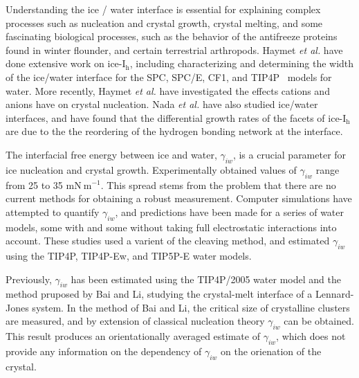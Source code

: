 %
%

Understanding the ice / water interface is essential for explaining
complex processes such as nucleation and crystal
growth,\cite{Han1992,Granasy1995,Vanfleet1995} crystal
melting,\cite{Weber1983,Han1992,Sakai1996,Sakai1996B} and some
fascinating biological processes, such as the behavior of the
antifreeze proteins found in winter flounder,\cite{Chapsky1997
  ,Wierzbicki2007} and certain terrestrial
arthropods.\cite{Duman:2001qy,Meister29012013} Haymet \textit{et al.}
have done extensive work on ice-I$_\mathrm{h}$, including
characterizing and determining the width of the ice/water interface
for the SPC,\cite{Karim1990} SPC/E,\cite{Gay2002,Bryk2002}
CF1,\cite{Hayward2001,Hayward2002} and TIP4P~\cite{Karim1988} models
for water.  More recently, Haymet \emph{et al.} have investigated the
effects cations and anions have on crystal
nucleation.\cite{Bryk2004,Smith2005,Wilson2008,Wilson2010} Nada
\textit{et al.}  have also studied ice/water
interfaces,\cite{Nada1995,Nada2000,Nada2003,Nada2012} and have found
that the differential growth rates of the facets of ice-I$_\mathrm{h}$
are due to the the reordering of the hydrogen bonding network at the
interface.\cite{Nada2005}



The interfacial free energy between ice and
water, $\gamma_{iw}$, is a crucial parameter for ice nucleation and
crystal growth.\cite{1,2} Experimentally obtained values of
$\gamma_{iw}$ range from 25 to 35
$\mathrm{mN}~\mathrm{m}^{-1}$.\cite{1} This spread stems from the
problem that there are no current methods for obtaining a robust
measurement. Computer simulations have attempted to quantify
$\gamma_{iw}$, and predictions have been made for a series of water
models, some with\cite{4} and some without\cite{5} taking full
electrostatic interactions into account. These studies used a varient
of the cleaving method,\cite{6} and estimated $\gamma_{iw}$ using the
TIP4P, TIP4P-Ew, and TIP5P-E water models.

Previously, $\gamma_{iw}$ has been estimated using the TIP4P/2005
water model and the method pruposed by Bai and Li, studying the
crystal-melt interface of a Lennard-Jones system.\cite{10} In the
method of Bai and Li, the critical size of crystalline clusters are
measured, and by extension of classical nucleation theory
$\gamma_{iw}$ can be obtained.\cite{11,12} This result produces an
orientationally averaged estimate of $\gamma_{iw}$, which does not
provide any information on the dependency of $\gamma_{iw}$ on the
orienation of the crystal.

